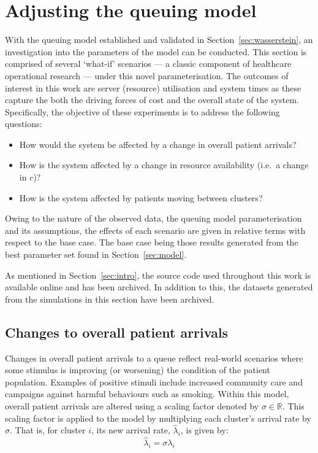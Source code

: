 \section{Adjusting the queuing model}\label{sec:scenarios}

With the queuing model established and validated in
Section~\ref{sec:wasserstein}, an investigation into the parameters of the model
can be conducted. This section is comprised of several `what-if' scenarios --- a
classic component of healthcare operational research --- under this novel
parameterisation. The outcomes of interest in this work are server (resource)
utilisation and system times as these capture the both the driving forces of
cost and the overall state of the system. Specifically, the objective of these
experiments is to address the following questions:
\begin{itemize}
    \item How would the system be affected by a change in overall patient
        arrivals?
    \item How is the system affected by a change in resource availability (i.e.\
        a change in \(c\))?
    \item How is the system affected by patients moving between clusters?
\end{itemize}

Owing to the nature of the observed data, the queuing model parameterisation
and its assumptions, the effects of each scenario are given in relative terms
with respect to the base case. The base case being those results generated from
the best parameter set found in Section~\ref{sec:model}.

As mentioned in Section~\ref{sec:intro}, the source code used throughout this
work is available online and has been archived. %
In addition to this, the datasets generated from the simulations in this section
have been archived. %


\subsection{Changes to overall patient arrivals}\label{subsec:arrivals}

Changes in overall patient arrivals to a queue reflect real-world scenarios
where some stimulus is improving (or worsening) the condition of the patient
population. Examples of positive stimuli include increased community care and
campaigns against harmful behaviours such as smoking. Within this model, overall
patient arrivals are altered using a scaling factor denoted by
\(\sigma\in\mathbb{R}\). This scaling factor is applied to the model by
multiplying each cluster's arrival rate by \(\sigma\). That is, for cluster
\(i\), its new arrival rate, \(\hat\lambda_i\), is given by:
\begin{equation}\label{eq:lambda}
    \hat\lambda_{i} = \sigma\lambda_i
\end{equation}

